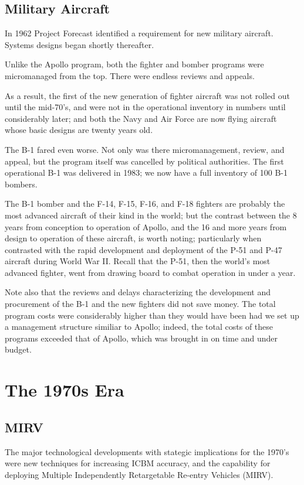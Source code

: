 \subsection{Military Aircraft}
In 1962 Project Forecast identified a requirement for new military aircraft. Systems designs began shortly thereafter.

Unlike the Apollo program, both the fighter and bomber programs were micromanaged from the top. There were endless reviews and appeals.

As a result, the first of the new generation of fighter aircraft was not rolled out until the mid-70's, and were not in the operational inventory in numbers until considerably later; and both the Navy and Air Force are now flying aircraft whose basic designs are twenty years old.

The B-1 fared even worse. Not only was there micromanagement, review, and appeal, but the program itself was cancelled by political authorities. The first operational B-1 was delivered in 1983; we now have a full inventory of 100 B-1 bombers.

The B-1 bomber and the F-14, F-15, F-16, and F-18 fighters are probably the most advanced aircraft of their kind in the world; but the contrast between the 8 years from conception to operation of Apollo, and the 16 and more years from design to operation of these aircraft, is worth noting; particularly when contrasted with the rapid development and deployment of the P-51 and P-47 aircraft during World War II. Recall that the P-51, then the world's most advanced fighter, went from drawing board to combat operation in under a year.

Note also that the reviews and delays characterizing the development and procurement of the B-1 and the new fighters did not save money. The total program costs were considerably higher than they would have been had we set up a management structure similiar to Apollo; indeed, the total costs of these programs exceeded that of Apollo, which was brought in on time and under budget.

\section{The 1970s Era}
\subsection{MIRV}
The major technological developments with stategic implications for the 1970's were new techniques for increasing ICBM accuracy, and the capability for deploying Multiple Independently Retargetable Re-entry Vehicles (MIRV).

